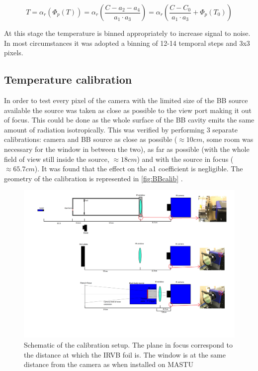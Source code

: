 \begin{equation}
T = {\alpha}_r ( {\Phi}_p(T)) = {\alpha}_r \left (\frac {C - a_2 - a_4} {a_1 \cdot a_3} \right ) = {\alpha}_r \left (\frac {C - C_0} {a_1 \cdot a_3} + {\Phi}_p (T_0) \right )
\label{eq:BBphotons4}
\end{equation}

At this stage the temperature is binned appropriately to increase signal to noise. In most circumstances it was adopted a binning of 12-14 temporal steps and 3x3 pixels.

\subsection{Temperature calibration}
In order to test every pixel of the camera with the limited size of the BB source available the source was taken as close as possible to the view port making it out of focus. This could be done as the whole surface of the BB cavity emits the same amount of radiation isotropically. This was verified by performing 3 separate calibrations: camera and BB source as close as possible ($\approx 10cm$, some room was necessary for the window in between the two), as far as possible (with the whole field of view still inside the source, $\approx 18cm$) and with the source in focus ($\approx 65.7cm$). It was found that the effect on the a1 coefficient is negligible.
The geometry of the calibration is represented in \autoref{fig:BBcalib} .

\begin{figure}
	\centering
	\includegraphics[trim={750 300 0 1200},clip,width=\linewidth]{Chapters/chapter2/figs/calib_schematics.png}
	\caption{Schematic of the calibration setup. The plane in focus correspond to the distance at which the IRVB foil is. The window is at the same distance from the camera as when installed on MASTU}
	\label{fig:BBcalib}
\end{figure}

